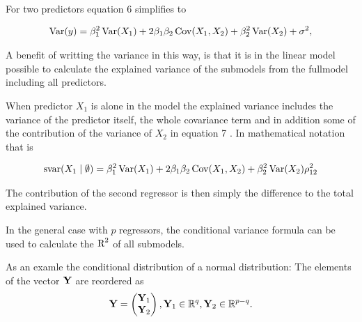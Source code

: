 \documentclass[11pt,a4paper,twoside]{book}
\begin{document}
For two predictors equation 6 simplifies to

      \begin{align} 
        \operatorname{Var}(y) = \beta_{1}^2 \operatorname{Var}(X_{1}) + 2  \beta_{1}  \beta_{2} \operatorname{Cov}(X_{1}, X_{2}) + \beta_{2}^2 \operatorname{Var}(X_{2}) + \sigma^2, \label{eq:8} 
   \end{align}

 A benefit of writting the variance in this way, is that it is in the linear model possible to calculate the explained variance of the submodels from the fullmodel including all predictors.
 
 When predictor $X_{1}$ is alone in the model the explained variance includes the variance of the predictor itself, the whole covariance term and in addition some of the contribution of the variance of $X_{2}$ in equation 7 . In mathematical notation that is
 
      \begin{align} 
        \text{svar}({X_{1}} \mid \emptyset ) = \beta_{1}^2 \operatorname{Var}(X_{1}) + 2  \beta_{1}  \beta_{2} \operatorname{Cov}(X_{1}, X_{2}) + \beta_{2}^2 \operatorname{Var}(X_{2}) \rho_{12}^2 \label{eq:7} 
   \end{align}
   
The contribution of the second regressor is then simply the difference to the total explained variance. 

In the general case with $p$ regressors, the conditional variance formula can be used to calculate the $\text{R}^2$ of all submodels.  

As an examle the conditional distribution of a normal distribution:
The elements of the vector ${\mathbf{Y}}$ are reordered as
\begin{align*}
\mathbf{Y} = \begin{pmatrix}
\mathbf{Y}_{1} \\ 
\mathbf{Y}_{2} \end{pmatrix}, \mathbf{Y}_{1} \in {\mathbb{R}}^q, \mathbf{Y}_{2} \in {\mathbb{R}}^{p-q} .
\end{align*}
\end{document}
